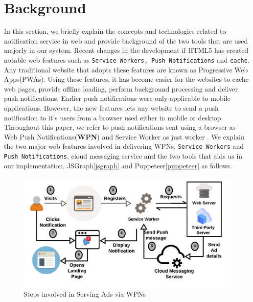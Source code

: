 \section{Background}

In this section, we briefly explain the concepts and technologies related to notification service in web and provide background of the two tools that are used majorly in our system. Recent changes in the development if HTML5 has created notable web features such as \texttt{Service Workers, Push Notifications} and \texttt{cache}. Any traditional website that adopts these features are known as Progressive Web Apps(PWAs). Using these features, it has become easier for the websites to cache web pages, provide offline loading, perform background processing and deliver push notifications. Earlier push notifications were only applicable to mobile applications. However, the new features lets any website to send a push notification to it's users from a browser used either in mobile or desktop. Throughout this paper, we refer to push notifications sent using a browser as Web Push Notifications(\textbf{WPN}) and Service Worker as just worker . We explain the two major web features involved in delivering WPNs, \texttt{Service Workers} and \texttt{Push Notifications}, cloud messaging service and the two tools that aids us in our implementation, JSGraph\ref{jsgraph} and Puppeteer\ref{puppeteer} as follows.


\begin{figure}[ht]
\includegraphics[width=\columnwidth]{figs/service_worker.pdf}
\caption{Steps involved in Serving Ads via WPNs}
\label{notification_system}
\end{figure}



